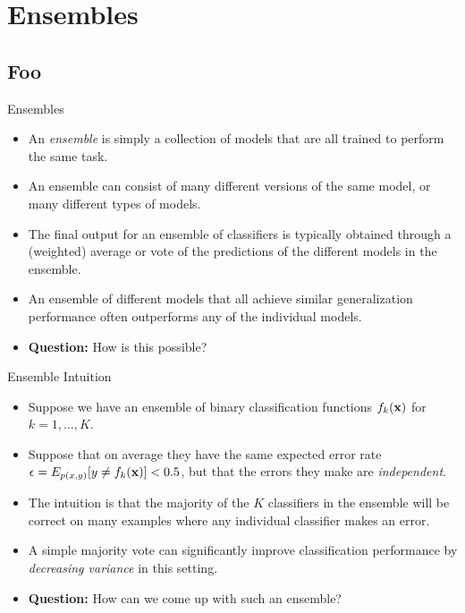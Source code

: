 \documentclass[serif,xcolor=pdftex,dvipsnames,table,hyperref={bookmarks=false,breaklinks}]{beamer}
\begin{document}
\maketitlepage


\section{Ensembles}
\subsection{Foo}

\begin{frame}[t]{Ensembles}

\begin{itemize}
\setlength{\itemsep}{8pt}

\item An \textit{ensemble} is simply a collection of models that are all trained to perform the same task. 

\pause\item An ensemble can consist of many different versions of the same model, or many different types of models.

\pause\item The final output for an ensemble of classifiers is typically obtained through a (weighted) average or vote of the predictions of the different models in the ensemble.

\pause\item An ensemble of different models that all achieve similar generalization performance often outperforms any of the individual models. 

\pause\item\textbf{Question:} How is this possible?

\end{itemize}

\end{frame}

\begin{frame}[t]{Ensemble Intuition}

\begin{itemize}
\setlength{\itemsep}{6pt}

\item Suppose we have an ensemble of binary classification functions $f_k({\mathbf{x}})$ for $k=1,...,K$.

\pause \item Suppose that on average they have the same expected error rate 
$\epsilon = E_{p(x,y)}[y\neq f_k({\mathbf{x}})]<0.5$, but that the errors they make are \textit{independent}. 

\pause\item The intuition is that the majority of the $K$ classifiers in the ensemble will be correct on many examples where any individual classifier makes an error. 

\pause \item A simple majority vote can significantly improve classification performance by \textit{decreasing variance} in this setting. 

\pause\item \textbf{Question:} How can we come up with such an ensemble?

\end{itemize}

\end{frame}
\end{document}
